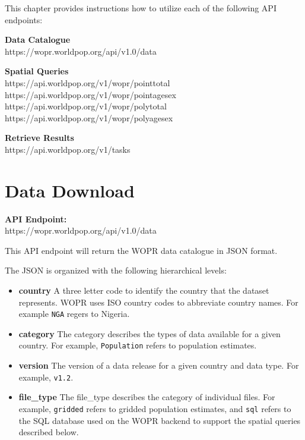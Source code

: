 \documentclass[]{book}
\begin{document}
This chapter provides instructions how to utilize each of the following
API endpoints:

\textbf{Data Catalogue}\\
https://wopr.worldpop.org/api/v1.0/data

\textbf{Spatial Queries}\\
https://api.worldpop.org/v1/wopr/pointtotal\\
https://api.worldpop.org/v1/wopr/pointagesex\\
https://api.worldpop.org/v1/wopr/polytotal\\
https://api.worldpop.org/v1/wopr/polyagesex

\textbf{Retrieve Results}\\
https://api.worldpop.org/v1/tasks

\section{Data Download}\label{data-download}

\textbf{API Endpoint:}\\
https://wopr.worldpop.org/api/v1.0/data

This API endpoint will return the WOPR data catalogue in JSON format.

 The JSON is organized with the following hierarchical levels:

\begin{itemize}
\item
  \textbf{country} A three letter code to identify the country that the
  dataset represents. WOPR uses ISO country codes to abbreviate country
  names. For example \texttt{\textquotesingle{}NGA\textquotesingle{}}
  regers to Nigeria.
\item
  \textbf{category} The category describes the types of data available
  for a given country. For example,
  \texttt{\textquotesingle{}Population\textquotesingle{}} refers to
  population estimates.
\item
  \textbf{version} The version of a data release for a given country and
  data type. For example,
  \texttt{\textquotesingle{}v1.2\textquotesingle{}}.
\item
  \textbf{file\_type} The file\_type describes the category of
  individual files. For example,
  \texttt{\textquotesingle{}gridded\textquotesingle{}} refers to gridded
  population estimates, and
  \texttt{\textquotesingle{}sql\textquotesingle{}} refers to the SQL
  database used on the WOPR backend to support the spatial queries
  described below.
\end{itemize}
\end{document}

